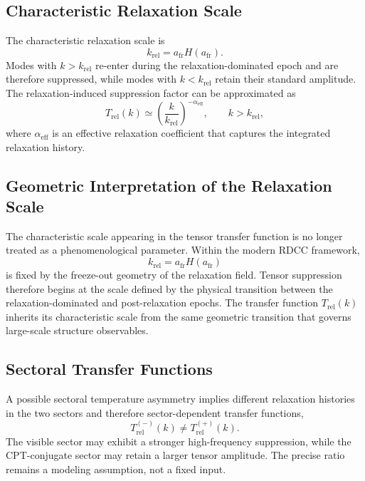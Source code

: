 \documentclass[11pt,a4paper]{article}
\begin{document}
\subsection{Characteristic Relaxation Scale}

The characteristic relaxation scale is
\begin{equation}
  k_{\mathrm{rel}}
  =
  a_{\mathrm{fr}} H(a_{\mathrm{fr}}).
\end{equation}
Modes with \(k > k_{\mathrm{rel}}\) re-enter during the
relaxation-dominated epoch and are therefore suppressed, while modes with
\(k < k_{\mathrm{rel}}\) retain their standard amplitude. The
relaxation-induced suppression factor can be approximated as
\begin{equation}
  T_{\mathrm{rel}}(k)
  \simeq
  \left(
    \frac{k}{k_{\mathrm{rel}}}
  \right)^{-\alpha_{\mathrm{eff}}},
  \qquad
  k > k_{\mathrm{rel}},
\end{equation}
where \(\alpha_{\mathrm{eff}}\) is an effective relaxation coefficient
that captures the integrated relaxation history.

\subsection{Geometric Interpretation of the Relaxation Scale}

The characteristic scale appearing in the tensor transfer function is no
longer treated as a phenomenological parameter. Within the modern RDCC
framework,
\begin{equation}
  k_{\mathrm{rel}}
  =
  a_{\mathrm{fr}} H(a_{\mathrm{fr}})
\end{equation}
is fixed by the freeze-out geometry of the relaxation field. Tensor
suppression therefore begins at the scale defined by the physical
transition between the relaxation-dominated and post-relaxation epochs.
The transfer function \(T_{\mathrm{rel}}(k)\) inherits its characteristic
scale from the same geometric transition that governs large-scale
structure observables.

\subsection{Sectoral Transfer Functions}

A possible sectoral temperature asymmetry implies different relaxation
histories in the two sectors and therefore sector-dependent transfer
functions,
\begin{equation}
  T_{\mathrm{rel}}^{(-)}(k)
  \neq
  T_{\mathrm{rel}}^{(+)}(k).
\end{equation}
The visible sector may exhibit a stronger high-frequency suppression,
while the CPT-conjugate sector may retain a larger tensor amplitude. The
precise ratio remains a modeling assumption, not a fixed input.
\end{document}

